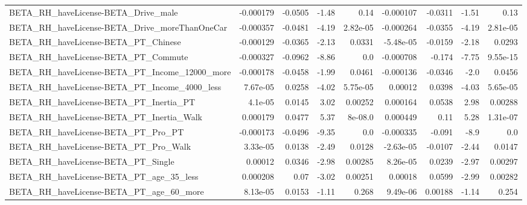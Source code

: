 \begin{tabular}{lrrrrrrrr}
BETA\_RH\_haveLicense-BETA\_Drive\_male                &   -0.000179 &      -0.0505 &    -1.48 &     0.14 &  -0.000107 &     -0.0311 &        -1.51 &          0.13 \\
BETA\_RH\_haveLicense-BETA\_Drive\_moreThanOneCar      &   -0.000357 &      -0.0481 &    -4.19 & 2.82e-05 &  -0.000264 &     -0.0355 &        -4.19 &      2.81e-05 \\
BETA\_RH\_haveLicense-BETA\_PT\_Chinese                &   -0.000129 &      -0.0365 &    -2.13 &   0.0331 &  -5.48e-05 &     -0.0159 &        -2.18 &        0.0293 \\
BETA\_RH\_haveLicense-BETA\_PT\_Commute                &   -0.000327 &      -0.0962 &    -8.86 &      0.0 &  -0.000708 &      -0.174 &        -7.75 &      9.55e-15 \\
BETA\_RH\_haveLicense-BETA\_PT\_Income\_12000\_more      &   -0.000178 &      -0.0458 &    -1.99 &   0.0461 &  -0.000136 &     -0.0346 &         -2.0 &        0.0456 \\
BETA\_RH\_haveLicense-BETA\_PT\_Income\_4000\_less       &    7.67e-05 &       0.0258 &    -4.02 & 5.75e-05 &    0.00012 &      0.0398 &        -4.03 &      5.65e-05 \\
BETA\_RH\_haveLicense-BETA\_PT\_Inertia\_PT             &     4.1e-05 &       0.0145 &     3.02 &  0.00252 &   0.000164 &      0.0538 &         2.98 &       0.00288 \\
BETA\_RH\_haveLicense-BETA\_PT\_Inertia\_Walk           &    0.000179 &       0.0477 &     5.37 &  8e-08.0 &   0.000449 &        0.11 &         5.28 &      1.31e-07 \\
BETA\_RH\_haveLicense-BETA\_PT\_Pro\_PT                 &   -0.000173 &      -0.0496 &    -9.35 &      0.0 &  -0.000335 &      -0.091 &         -8.9 &           0.0 \\
BETA\_RH\_haveLicense-BETA\_PT\_Pro\_Walk               &    3.33e-05 &       0.0138 &    -2.49 &   0.0128 &  -2.63e-05 &     -0.0107 &        -2.44 &        0.0147 \\
BETA\_RH\_haveLicense-BETA\_PT\_Single                 &     0.00012 &       0.0346 &    -2.98 &  0.00285 &   8.26e-05 &      0.0239 &        -2.97 &       0.00297 \\
BETA\_RH\_haveLicense-BETA\_PT\_age\_35\_less            &    0.000208 &         0.07 &    -3.02 &  0.00251 &    0.00018 &      0.0599 &        -2.99 &       0.00282 \\
BETA\_RH\_haveLicense-BETA\_PT\_age\_60\_more            &    8.13e-05 &       0.0153 &    -1.11 &    0.268 &   9.49e-06 &     0.00188 &        -1.14 &         0.254 \\

\end{tabular}
